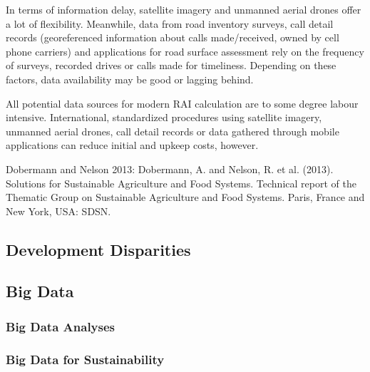                 In terms of information delay, satellite imagery and unmanned aerial drones offer a lot of flexibility. Meanwhile, data from road inventory surveys, call detail records (georeferenced information about calls made/received, owned by cell phone carriers) and applications for road surface assessment rely on the frequency of surveys, recorded drives or calls made for timeliness. Depending on these factors, data availability may be good or lagging behind.

                
                \medskip
                
                All potential data sources for modern RAI calculation are to some degree labour intensive. International, standardized procedures using satellite imagery, unmanned aerial drones, call detail records or data gathered through mobile applications can reduce initial and upkeep costs, however.
                
                \medskip
                
                
                
                
                
                
                
                \bigskip
	            Dobermann and Nelson 2013: Dobermann, A. and Nelson, R. et al. (2013). Solutions for Sustainable Agriculture and Food Systems. Technical report of the Thematic Group on Sustainable Agriculture and Food Systems. Paris, France and New York, USA: SDSN.
	            
	            \medskip

	            \medskip
	            
		
		
		\subsection{Development Disparities}
		
		
		
		\subsection{Big Data}
			\subsubsection{Big Data Analyses}
			
			\subsubsection{Big Data for Sustainability}
			
